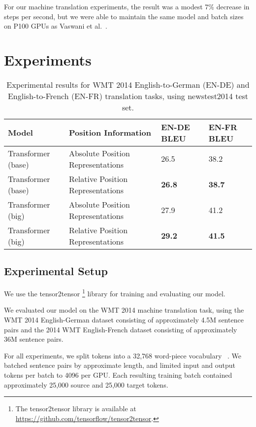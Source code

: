 \documentclass[11pt,a4paper]{article}
\begin{document}
For our machine translation experiments, the result was a modest 7\% decrease in steps per second, but we were able to maintain the same model and batch sizes on P100 GPUs as Vaswani et al.~.

\section{Experiments}

\begin{table*}[t!]

\begin{center}
\begin{tabular}{llll}
\hline
Model & Position Information & EN-DE BLEU & EN-FR BLEU \\
\hline
Transformer (base) & Absolute Position Representations & 26.5 & 38.2 \\
Transformer (base) & Relative Position Representations & \bf 26.8 & \bf 38.7 \\
\hline
Transformer (big) & Absolute Position Representations & 27.9 & 41.2 \\
Transformer (big) & Relative Position Representations & \bf 29.2 & \bf 41.5 \\
\hline
\end{tabular}
\end{center}
\caption{Experimental results for WMT 2014 English-to-German (EN-DE) and English-to-French (EN-FR) translation tasks, using newstest2014 test set.}
\label{mtresults}
\end{table*}

\subsection{Experimental Setup}

We use the tensor2tensor
\footnote{The tensor2tensor library is available at \url{https://github.com/tensorflow/tensor2tensor}.
}
library for training and evaluating our model.

We evaluated our model on the WMT 2014 machine translation task, using the WMT 2014 English-German dataset consisting of approximately 4.5M sentence pairs and
the 2014 WMT English-French dataset consisting of approximately 36M sentence pairs.

For all experiments, we split tokens into a 32,768 word-piece vocabulary ~\cite{wu2016}.
We batched sentence pairs by approximate length, and limited input and output tokens per batch to 4096 per GPU.
Each resulting training batch contained approximately 25,000 source and 25,000 target tokens.
\end{document}
